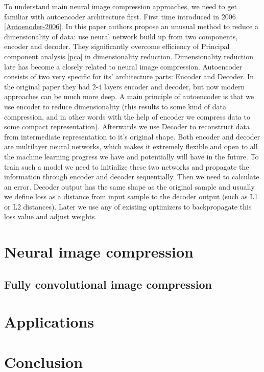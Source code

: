 To understand main neural image compression approaches, we need to get familiar with autoencoder architecture first. First time introduced in 2006 \ref{Autoenoder-2006}. In this paper authors propose an unusual method to reduce a dimensionality of data: use neural network build up from two components, encoder and decoder. They significantly overcome efficiency of Principal component analysis \ref{pca} in dimensionality reduction. Dimensionality reduction late has become a closely related to neural image compression. Autoencoder consists of two very specific for its' architecture parts: Encoder and Decoder. In the original paper they had 2-4 layers encoder and decoder, but now modern approaches can be much more deep. A main principle of autoencoder is that we use encoder to reduce dimensionality (this results to some kind of data compression, and in other words with the help of encoder we compress data to some compact representation). Afterwards we use Decoder to reconstruct data from intermediate representation to it's original shape. Both encoder and decoder are multilayer neural networks, which makes it extremely flexible and open to all the machine learning progress we have and potentially will have in the future. To train such a model we need to initialize these two networks and propagate the information through encoder and decoder sequentially. Then we need to calculate an error. Decoder output has the same shape as the original sample and usually we define loss as a distance from input sample to the decoder output (such as L1 or L2 distances). Later we use any of existing optimizers to backpropagate this loss value and adjust weights.



\chapter{Neural image compression}

\section{Fully convolutional image compression}

\chapter{Applications}

\chapter{Conclusion}
